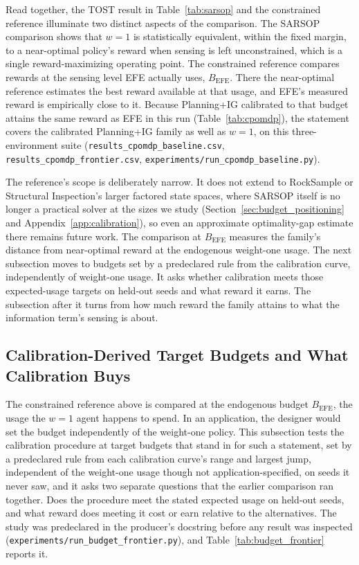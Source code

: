 Read together, the TOST result in Table~\ref{tab:sarsop} and the constrained reference illuminate two distinct aspects of the comparison. The SARSOP comparison shows that $w{=}1$ is statistically equivalent, within the fixed margin, to a near-optimal policy's reward when sensing is left unconstrained, which is a single reward-maximizing operating point. The constrained reference compares rewards at the sensing level EFE actually uses, $B_{\mathrm{EFE}}$. There the near-optimal reference estimates the best reward available at that usage, and EFE's measured reward is empirically close to it. Because Planning+IG calibrated to that budget attains the same reward as EFE in this run (Table~\ref{tab:cpomdp}), the statement covers the calibrated Planning+IG family as well as $w{=}1$, on this three-environment suite (\texttt{results\_\allowbreak cpomdp\_\allowbreak baseline.csv}, \texttt{results\_\allowbreak cpomdp\_\allowbreak frontier.csv}, \texttt{experiments/\allowbreak run\_\allowbreak cpomdp\_\allowbreak baseline.py}).

The reference's scope is deliberately narrow. It does not extend to RockSample or Structural Inspection's larger factored state spaces, where SARSOP itself is no longer a practical solver at the sizes we study (Section~\ref{sec:budget_positioning} and Appendix~\ref{app:calibration}), so even an approximate optimality-gap estimate there remains future work. The comparison at $B_{\mathrm{EFE}}$ measures the family's distance from near-optimal reward at the endogenous weight-one usage. The next subsection moves to budgets set by a predeclared rule from the calibration curve, independently of weight-one usage. It asks whether calibration meets those expected-usage targets on held-out seeds and what reward it earns. The subsection after it turns from how much reward the family attains to what the information term's sensing is about.

\subsection{Calibration-Derived Target Budgets and What Calibration Buys}
\label{sec:budget_frontier}

The constrained reference above is compared at the endogenous budget $B_{\mathrm{EFE}}$, the usage the $w{=}1$ agent happens to spend. In an application, the designer would set the budget independently of the weight-one policy. This subsection tests the calibration procedure at target budgets that stand in for such a statement, set by a predeclared rule from each calibration curve's range and largest jump, independent of the weight-one usage though not application-specified, on seeds it never saw, and it asks two separate questions that the earlier comparison ran together. Does the procedure meet the stated expected usage on held-out seeds, and what reward does meeting it cost or earn relative to the alternatives. The study was predeclared in the producer's docstring before any result was inspected (\texttt{experiments/\allowbreak run\_\allowbreak budget\_\allowbreak frontier.py}), and Table~\ref{tab:budget_frontier} reports it.

